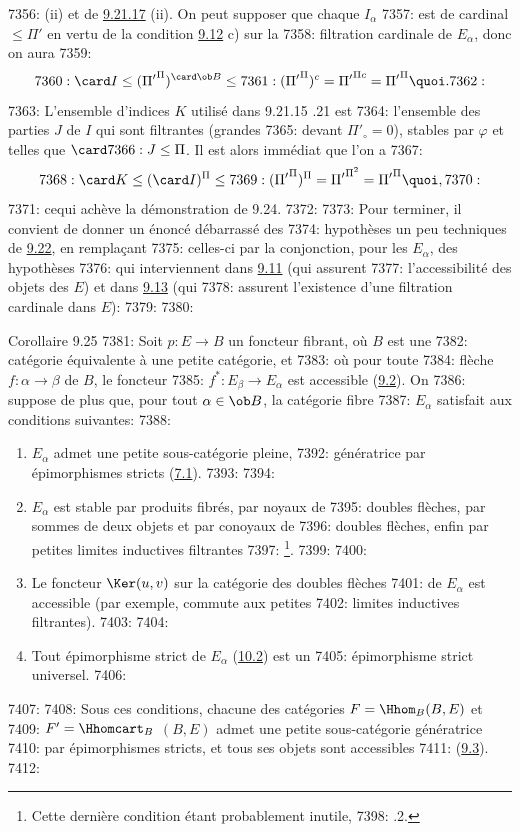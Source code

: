 7356: (ii) et de \hyperref[I.lem9.21.17]{9.21.17} (ii). On peut supposer que chaque $I_{\alpha}$
7357: est de cardinal $\leq \Pi'$ en vertu de la condition \hyperref[I.def9.12]{9.12} c) sur la
7358: filtration cardinale de $E_{\alpha}$, donc on aura
7359: $$
7360: \card I\leq ({\Pi'}^{\Pi})^{\card \ob B}\leq
7361: ({\Pi'}^{\Pi})^c={\Pi'}^{\Pi c}={\Pi'}^{\Pi}{\quoi}.
7362: $$
7363: L'ensemble d'indices $K$ utilisé dans 9.21.15 .21 est
7364: l'ensemble des parties $J$ de $I$ qui sont filtrantes (\ie grandes
7365: devant $\Pi'_{\circ}=0$), stables par $\varphi$ et telles que $\card
7366: J\leq \Pi$. Il est alors immédiat que l'on a
7367: $$
7368: \card K\leq (\card I)^{\Pi}\leq
7369: ({\Pi'}^{\Pi})^{\Pi}={\Pi'}^{\Pi^2}={\Pi'}^{\Pi}{\quoi},
7370: $$
7371: ce\pageoriginale qui achève la démonstration de 9.24.
7372: 
7373: Pour terminer, il convient de donner un énoncé débarrassé des
7374: hypothèses un peu techniques de \hyperref[I.them9.22]{9.22}, en remplaçant
7375: celles-ci par la conjonction, pour les $E_{\alpha}$, des hypothèses
7376: qui interviennent dans \hyperref[I.prop9.11]{9.11} (qui assurent
7377: l'accessibilité des objets des $E$) et dans \hyperref[I.prop9.13]{9.13} (qui
7378: assurent l'existence d'une filtration cardinale dans $E$):
7379: 
7380: \begin{enonce*}{Corollaire 9.25}
7381: Soit $p:E\rightarrow B$ un foncteur fibrant, où $B$ est une
7382: catégorie équivalente à une petite catégorie, et
7383: où pour toute
7384: flèche $f:\alpha\rightarrow \beta$ de $B$, le foncteur
7385: $f^\ast:E_{\beta}\rightarrow E_{\alpha}$ est accessible (\hyperref[I.def9.2]{9.2}). On
7386: suppose de plus que, pour tout $\alpha\in \ob B$, la catégorie fibre
7387: $E_{\alpha}$ satisfait aux conditions suivantes:
7388: \begin{enumerate}
7389: \renewcommand{\theenumi}{\alph{enumi}}
7390: \renewcommand{\labelenumi}{\theenumi)}
7391: \item $E_{\alpha}$ admet une petite sous-catégorie pleine,
7392: génératrice par épimorphismes stricts (\hyperref[I.def7.1]{7.1}).
7393: 
7394: \item $E_{\alpha}$ est stable par produits fibrés, par noyaux de
7395: doubles flèches, par sommes de deux objets et par conoyaux de
7396: doubles flèches, enfin par petites limites inductives filtrantes
7397: \footnote[1]{Cette dernière condition étant probablement inutile,
7398: .2.}.
7399: 
7400: \item Le foncteur $\Ker(u,v)$ sur la catégorie des doubles flèches
7401: de $E_{\alpha}$ est accessible (par exemple, commute aux petites
7402: limites inductives filtrantes).
7403: 
7404: \item Tout épimorphisme strict de $E_{\alpha}$ (\hyperref[I.sec10.2]{10.2}) est un
7405: épimorphisme strict universel.
7406: \end{enumerate}
7407: 
7408: Sous ces conditions, chacune des catégories $F=\Hhom_B(B,E)$ et
7409: $F'=\Hhomcart_B$ $(B,E)$ admet une petite sous-catégorie génératrice
7410: par épimorphismes stricts, et tous ses objets sont accessibles
7411: (\hyperref[I.def9.3]{9.3}).
7412: \end{enonce*}
